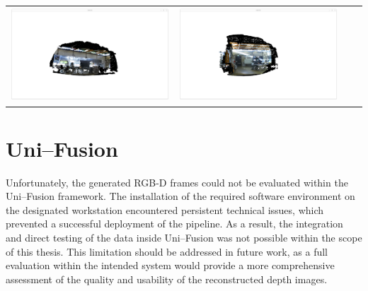\documentclass[english, bachelor, utf8]{base/thesis_telematics}
\begin{document}
\begin{table}[h]
\begin{tabular}{
  >{\centering\arraybackslash}m{}
  >{\centering\arraybackslash}m{}
  >{\centering\arraybackslash}m{}
  >{\centering\arraybackslash}m{}
}
    \includegraphics[width=\linewidth]{pics/robo/robo_3/Screenshot from 2025-09-14 18-26-00.png} &
    \includegraphics[width=\linewidth]{pics/robo/robo_4/Screenshot from 2025-09-14 18-26-36.png} \\
    \end{tabular}
\end{table}

    \section{Uni--Fusion}

    Unfortunately, the generated RGB-D frames could not be evaluated within the Uni--Fusion framework. The 
    installation of the required software environment on the designated workstation encountered persistent 
    technical issues, which prevented a successful deployment of the pipeline. As a result, the integration 
    and direct testing of the data inside Uni--Fusion was not possible within the scope of this thesis. This 
    limitation should be addressed in future work, as a full evaluation within the intended system would 
    provide a more comprehensive assessment of the quality and usability of the reconstructed depth images.
\end{document}
